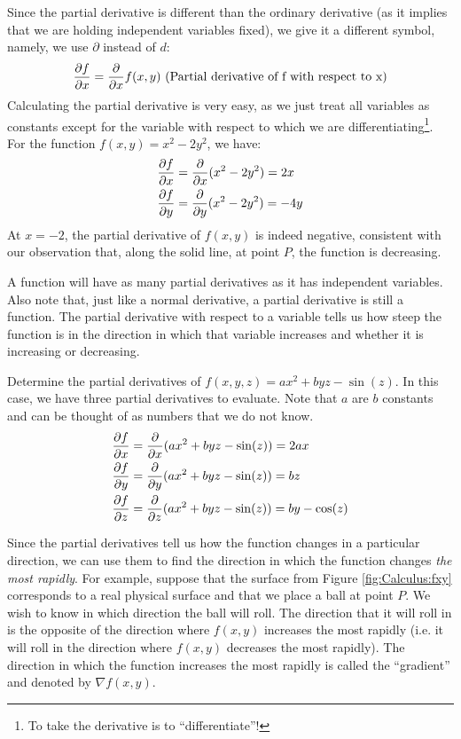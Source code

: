  Since the partial derivative is different than the ordinary derivative (as it implies that we are holding independent variables fixed), we give it a different symbol, namely, we use $\partial$ instead of $d$:
\begin{align*}
\frac{\partial f}{\partial x}=\frac{\partial }{\partial x}f(x,y)\text{ (Partial derivative of f with respect to x)}
\end{align*}
Calculating the partial derivative is very easy, as we just treat all variables as constants except for the variable with respect to which we are differentiating\footnote{To take the derivative is to ``differentiate''!}. For the function $f(x,y)=x^2-2y^2$, we have:
\begin{align*}
\frac{\partial f}{\partial x}&=\frac{\partial }{\partial x}(x^2-2y^2) = 2x\\
\frac{\partial f}{\partial y}&=\frac{\partial }{\partial y}(x^2-2y^2) = -4y
\end{align*}
At $x=-2$, the partial derivative of $f(x,y)$ is indeed negative, consistent with our observation that, along the solid line, at point $P$, the function is decreasing.

A function will have as many partial derivatives as it has independent variables. Also note that, just like a normal derivative, a partial derivative is still a function. The partial derivative with respect to a variable tells us how steep the function is in the direction in which that variable increases and whether it is increasing or decreasing.

\begin{example}{Determine the partial derivatives of $f(x,y,z)=ax^2+byz-\sin(z)$.}
In this case, we have three partial derivatives to evaluate. Note that $a$ are $b$ constants and can be thought of as numbers that we do not know.
\label{ex:Calculus:partials}
\begin{align*}
\frac{\partial f}{\partial x}&=\frac{\partial }{\partial x}(ax^2+byz-\sin(z)) = 2ax\\
\frac{\partial f}{\partial y}&=\frac{\partial }{\partial y}(ax^2+byz-\sin(z)) = bz \\
\frac{\partial f}{\partial z}&=\frac{\partial }{\partial z}(ax^2+byz-\sin(z)) = by-\cos(z) 
\end{align*} 
\end{example}

Since the partial derivatives tell us how the function changes in a particular direction, we can use them to find the direction in which the function changes \textit{the most rapidly}. For example, suppose that the surface from Figure \ref{fig:Calculus:fxy} corresponds to a real physical surface and that we place a ball at point $P$. We wish to know in which direction the ball will roll. The direction that it will roll in is the opposite of the direction where $f(x,y)$ increases the most rapidly (i.e. it will roll in the direction where $f(x,y)$ decreases the most rapidly). The direction in which the function increases the most rapidly is called the ``gradient'' and denoted by $\nabla f(x,y)$.

